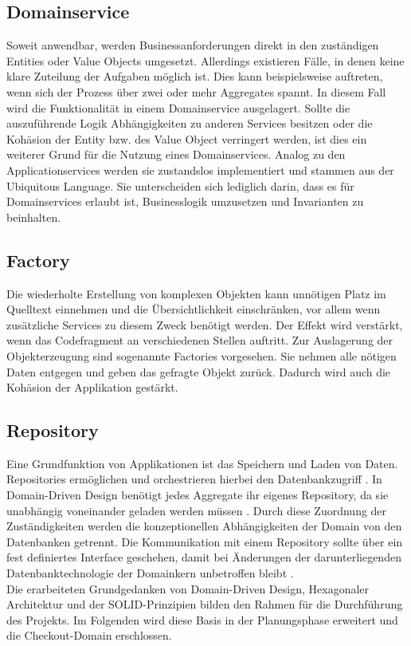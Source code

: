 \subsection{Domainservice}

Soweit anwendbar, werden Businessanforderungen direkt in den zuständigen Entities oder Value Objects umgesetzt. Allerdings existieren Fälle, in denen keine klare Zuteilung der Aufgaben möglich ist. Dies kann beispielsweise auftreten, wenn sich der Prozess über zwei oder mehr Aggregates spannt. In diesem Fall wird die Funktionalität in einem Domainservice ausgelagert. Sollte die auszuführende Logik Abhängigkeiten zu anderen Services besitzen oder die Kohäsion der Entity bzw. des Value Object verringert werden, ist dies ein weiterer Grund für die Nutzung eines Domainservices. Analog zu den Applicationservices werden sie zustandslos implementiert und stammen aus der Ubiquitous Language. Sie unterscheiden sich lediglich darin, dass es für Domainservices erlaubt ist, Businesslogik umzusetzen und Invarianten zu beinhalten. \cite[S. 268]{Vernon.2015}

\subsection{Factory}

Die wiederholte Erstellung von komplexen Objekten kann unnötigen Platz im Quelltext einnehmen und die Übersichtlichkeit einschränken, vor allem wenn zusätzliche Services zu diesem Zweck benötigt werden. Der Effekt wird verstärkt, wenn das Codefragment an verschiedenen Stellen auftritt. Zur Auslagerung der Objekterzeugung sind sogenannte Factories vorgesehen. Sie nehmen alle nötigen Daten entgegen und geben das gefragte Objekt zurück. Dadurch wird auch die Kohäsion der Applikation gestärkt. \cite[S. 137f.]{Evans.2011}

\subsection{Repository}

Eine Grundfunktion von Applikationen ist das Speichern und Laden von Daten. Repositories ermöglichen und orchestrieren hierbei den Datenbankzugriff \cite[S. 151]{Evans.2011}. In Domain-Driven Design benötigt jedes Aggregate ihr eigenes Repository, da sie unabhängig voneinander geladen werden müssen \cite[S. 401]{Vernon.2015}. Durch diese Zuordnung der Zuständigkeiten werden die konzeptionellen Abhängigkeiten der Domain von den Datenbanken getrennt. Die Kommunikation mit einem Repository sollte über ein fest definiertes Interface geschehen, damit bei Änderungen der darunterliegenden Datenbanktechnologie der Domainkern unbetroffen bleibt \cite[S. 152]{Evans.2011}. \\

Die erarbeiteten Grundgedanken von Domain-Driven Design, Hexagonaler Architektur und der SOLID-Prinzipien bilden den Rahmen für die Durchführung des Projekts. Im Folgenden wird diese Basis in der Planungsphase erweitert und die Checkout-Domain erschlossen.
